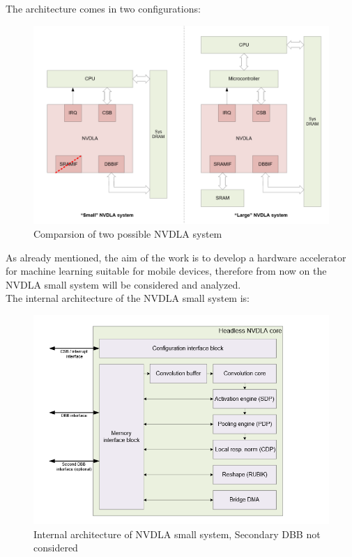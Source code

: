 The architecture comes in two configurations:

\begin{figure}[!htbp]
\centering
\captionsetup{justification=centering}
\includegraphics[scale=0.4]{./figure/nvdla_system.PNG}
\caption{Comparsion of two possible NVDLA system\cite{WEBSITE:8}}
\label{fig:nvdlasystem}
\end{figure}
As already mentioned, the aim of the work is to develop a hardware accelerator for machine learning suitable for mobile devices, therefore from now on the NVDLA small system will be considered and analyzed.\\
The internal architecture of the NVDLA small system is:
\begin{figure}[!htbp]
\centering
\captionsetup{justification=centering}
\includegraphics[scale=0.5]{./figure/nvdla_internal.PNG}
\centering\caption{Internal architecture of NVDLA small system, Secondary DBB not considered\cite{WEBSITE:8}}
\label{fig:nvdlaarch}
\end{figure}

